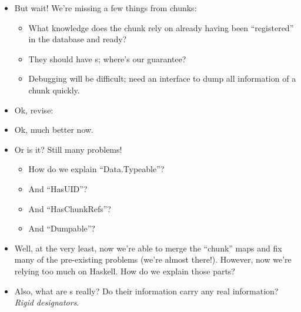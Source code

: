 \begin{itemize}
      \item But wait! We're missing a few things from chunks:
            \begin{itemize}

                  \item What knowledge does the chunk rely on already having
                        been ``registered'' in the database and ready?

                  \item They should have \UID{}s; where's our guarantee?

                  \item Debugging will be difficult; need an interface to dump
                        all information of a chunk quickly.

            \end{itemize}

      \item Ok, revise: 

      \item Ok, much better now.

      \item Or is it? Still many problems!
            \begin{itemize}

                  \item How do we explain ``Data.Typeable''?

                  \item And ``HasUID''?

                  \item And ``HasChunkRefs''?

                  \item And ``Dumpable''?

            \end{itemize}

      \item Well, at the very least, now we're able to merge the ``chunk'' maps
            and fix many of the pre-existing problems (we're almost there!).
            However, now we're relying too much on Haskell. How do we explain
            those parts?

      \item Also, what are \UID{}s really? Do their information carry any real
            information? \textit{Rigid designators}.

\end{itemize}


